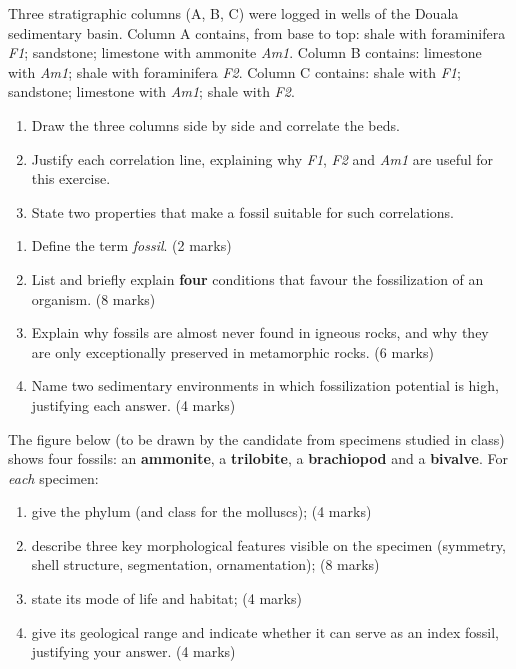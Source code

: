 \documentclass[11pt]{article}
\newcounter{popsec}
\newcounter{popsub}
\newcommand{\courssub}[1]{%
  \stepcounter{popsub}%
  \par\vspace{9pt}\noindent{\popxbold\fontsize{11.5}{13}\selectfont\color{popink}{\color{poporange}\thepopsec.\thepopsub}\hspace{6pt}#1}\par\nopagebreak\vspace{4pt}
}
\begin{document}
\begin{exercice}
Three stratigraphic columns (A, B, C) were logged in wells of the Douala sedimentary basin. Column A contains, from base to top: shale with foraminifera \emph{F1}; sandstone; limestone with ammonite \emph{Am1}. Column B contains: limestone with \emph{Am1}; shale with foraminifera \emph{F2}. Column C contains: shale with \emph{F1}; sandstone; limestone with \emph{Am1}; shale with \emph{F2}.
\begin{enumerate}
\item Draw the three columns side by side and correlate the beds.
\item Justify each correlation line, explaining why \emph{F1}, \emph{F2} and \emph{Am1} are useful for this exercise.
\item State two properties that make a fossil suitable for such correlations.
\end{enumerate}
\end{exercice}

\courssub{I prepare for the GCE}

\begin{exercice}
\begin{enumerate}
\item Define the term \emph{fossil}. \hfill (2 marks)
\item List and briefly explain \textbf{four} conditions that favour the fossilization of an organism. \hfill (8 marks)
\item Explain why fossils are almost never found in igneous rocks, and why they are only exceptionally preserved in metamorphic rocks. \hfill (6 marks)
\item Name two sedimentary environments in which fossilization potential is high, justifying each answer. \hfill (4 marks)
\end{enumerate}
\end{exercice}

\begin{exercice}
The figure below (to be drawn by the candidate from specimens studied in class) shows four fossils: an \textbf{ammonite}, a \textbf{trilobite}, a \textbf{brachiopod} and a \textbf{bivalve}. For \emph{each} specimen:
\begin{enumerate}
\item give the phylum (and class for the molluscs); \hfill (4 marks)
\item describe three key morphological features visible on the specimen (symmetry, shell structure, segmentation, ornamentation); \hfill (8 marks)
\item state its mode of life and habitat; \hfill (4 marks)
\item give its geological range and indicate whether it can serve as an index fossil, justifying your answer. \hfill (4 marks)
\end{enumerate}
\end{exercice}
\end{document}

